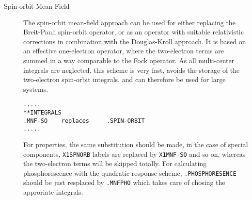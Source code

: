 \begin{description}
\begin{center}
\end{center}

\item[Spin-orbit Mean-Field] The spin-orbit mean-field approach can be used 
for either replacing the Breit-Pauli spin-orbit operator, or as an operator 
with suitable relativistic corrections in combination with the Douglas-Kroll 
approach. It is based on an effective one-electron operator, where the two-electron
terms are summed in a way comparable to the Fock operator. As all multi-center 
integrals are neglected, this scheme is very fast, avoids the storage of the 
two-electron spin-orbit integrals, and can therefore be used for large systems. 

\begin{verbatim}
.....
**INTEGRALS    
.MNF-SO    replaces     .SPIN-ORBIT             
.....
\end{verbatim}

For properties, the same substitution should be made, in the case of special 
components, \verb|X1SPNORB| labels are replaced by \verb|X1MNF-SO| and so on, whereas the 
two-electron terms will be skipped totally. For calculating phosphorescence with 
the quadratic response scheme, \verb|.PHOSPHORESENCE| should be just resplaced by 
\verb|.MNFPHO| which takes care of chosing the approriate integrals. 


\begin{center}
\end{center}



\end{description}
